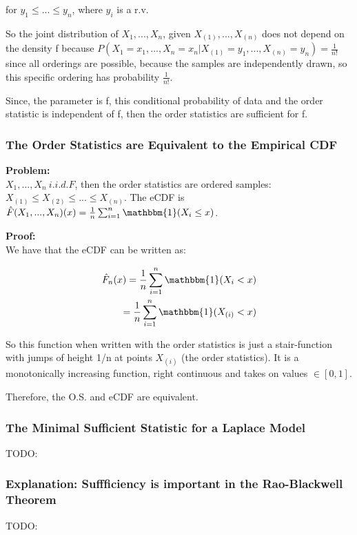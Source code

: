         for $y_1 \le ... \le y_n$, where $y_i$ is a r.v.

        So the joint distribution of $X_1, ..., X_n$, given $X_{(1)}, ..., X_{(n)}$ does not depend on the density f because $P(X_1 = x_1, ..., X_n=x_n | X_{(1)}=y_1, ..., X_{(n)}=y_n) = \frac{1}{n!}$ since all orderings are possible, because the samples are independently drawn, so this specific ordering has probability $\frac{1}{n!}$.

        Since, the parameter is f, this conditional probability of data and the order statistic is independent of f, then the order statistics are sufficient for f.

		\subsubsection{The Order Statistics are Equivalent to the Empirical CDF}
      \textbf{Problem:}\\
       $X_1, ..., X_n ~ i.i.d. F$, then the order statistics are ordered samples: $X_{(1)} \le X_{(2)} \le ... \le X_{(n)}$. The eCDF is $\hat{F}(X_1, ..., X_n)(x) = \frac{1}{n} \sum_{i=1}^n \mathbbm{1}(X_i \le x)$.

      \textbf{Proof:}\\
        We have that the eCDF can be written as:

        \begin{align*}
          \hat{F}_n(x) = \frac{1}{n} \sum_{i=1}^n \mathbbm{1} (X_i < x) \\
          = \frac{1}{n} \sum_{i=1}^n \mathbbm{1} (X_{(i)} < x) \\
        \end{align*}

        So this function when written with the order statistics is just a stair-function with jumps of height 1/n at points $X_{(i)}$ (the order statistics). It is a monotonically increasing function, right continuous and takes on values $\in [0,1]$.

        Therefore, the O.S. and eCDF are equivalent.

		\subsubsection{The Minimal Sufficient Statistic for a Laplace Model}
      TODO:

		\subsubsection{Explanation: Suffficiency is important in the Rao-Blackwell Theorem}
      TODO: